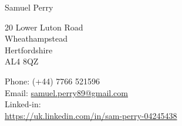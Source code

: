 \documentclass[10pt,letterpaper]{article}
\def\name{Samuel Perry}
\begin{document}
{\huge\name}


\bigskip

\begin{minipage}[t]{0.495\textwidth}
  20 Lower Luton Road\\
  Wheathampstead\\
  Hertfordshire\\
  AL4 8QZ\\

\end{minipage}
\begin{minipage}[t]{0.495\textwidth}
    Phone: (+44) 7766 521596\\
    Email: \href{mailto:samuel.perry89@gmail.com}{samuel.perry89@gmail.com} \\
    Linked-in: \\\href{https://uk.linkedin.com/in/sam-perry-04245438}{https://uk.linkedin.com/in/sam-perry-04245438}
\end{minipage}
\end{document}
